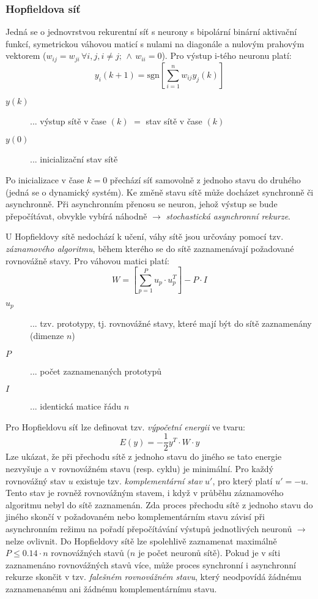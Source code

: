 \subsubsection*{Hopfieldova síť}
Jedná se o jednovrstvou rekurentní síť s neurony s bipolární binární aktivační funkcí, symetrickou váhovou maticí s nulami na diagonále a nulovým prahovým vektorem ($ w_{ij} = w_{ji} \, \forall i,j, i \neq j; \, \land \, w_{ii} = 0 $). Pro výstup i-tého neuronu platí:
\begin{equation}
y_i(k+1) = \mathrm{sgn}\left[ \displaystyle{\sum_{i=1}^n w_{ij} y_j(k)} \right]
\end{equation}
\begin{description}
\item[$ y(k) $] ... výstup sítě v čase $ (k) $ $ = $ stav sítě v čase $ (k) $
\item[$ y(0) $] ... inicializační stav sítě
\end{description}
Po inicializace v čase $ k=0 $ přechází síť samovolně z jednoho stavu do druhého (jedná se o dynamický systém). Ke změně stavu sítě může docházet synchronně či asynchronně. Při asynchronním přenosu se neuron, jehož výstup se bude přepočítávat, obvykle vybírá náhodně $ \to $ \textit{stochastická asynchronní rekurze}. 

U Hopfieldovy sítě nedochází k učení, váhy sítě jsou určovány pomocí tzv. \textit{záznamového algoritmu}, během kterého se do sítě zaznamenávají požadované rovnovážně stavy. Pro váhovou matici platí:
\begin{equation}
W = \left[ \displaystyle{\sum_{p=1}^P} u_p \cdot u_p^T \right] - P \cdot I
\end{equation}
\begin{description}
\item[$ u_p $] ... tzv. prototypy, tj. rovnovážné stavy, které mají být do sítě zaznamenány (dimenze $ n $)
\item[$ P $] ... počet zaznamenaných prototypů
\item[$ I $] ... identická matice řádu $ n $
\end{description}
Pro Hopfieldovu síť lze definovat tzv. \textit{výpočetní energii} ve tvaru:
\begin{equation}
E(y) = -\frac{1}{2} y^T \cdot W \cdot y
\end{equation}
Lze ukázat, že při přechodu sítě z jednoho stavu do jiného se tato energie nezvyšuje a v rovnovážném stavu (resp. cyklu) je minimální. Pro každý rovnovážný stav $ u $ existuje tzv. \textit{komplementární stav} $ u' $, pro který platí $ u' = -u $. Tento stav je rovněž rovnovážným stavem, i když v průběhu záznamového algoritmu nebyl do sítě zaznamenán. Zda proces přechodu sítě z jednoho stavu do jiného skončí v požadovaném nebo komplementárním stavu závisí při asynchronním režimu na pořadí přepočítávání výstupů jednotlivých neuronů $ \to $ nelze ovlivnit. Do Hopfieldovy sítě lze spolehlivě zaznamenat maximálně $ P \leq 0.14 \cdot n $ rovnovážných stavů ($ n $ je počet neuronů sítě). Pokud je v síti zaznamenáno rovnovážných stavů více, může proces synchronní i asynchronní rekurze skončit v tzv. \textit{falešném rovnovážném stavu}, který neodpovídá žádnému zaznamenanému ani žádnému komplementárnímu stavu.

